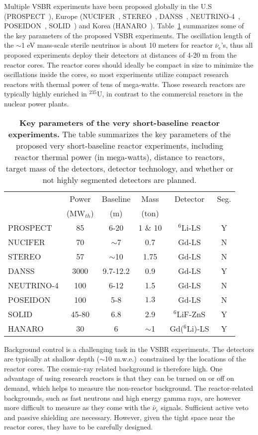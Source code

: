 \documentclass[aps,twocolumn,preprintnumbers,amsmath,superscriptaddress,amssymb,floats,nofootinbib]{revtex4-1}
\begin{document}
Multiple VSBR experiments have been proposed globally in the U.S (PROSPECT~\cite{PROSPECT}), Europe (NUCIFER~\cite{NUCIFER-2010, NUCIFER-2014}, STEREO~\cite{NUCIFER-2014}, DANSS~\cite{DANSS}, NEUTRINO-4~\cite{NEUTRINO4-2012,NEUTRINO4-2014}, POSEIDON~\cite{POSEIDON}, SOLID~\cite{SoLid}) and Korea (HANARO~\cite{HANARO}). 
Table~\ref{tab:sterile} summarizes some of the key parameters of the proposed VSBR experiments. 
The oscillation length of the $\sim$1 eV mass-scale sterile neutrinos is about 10 meters for reactor $\bar\nu_e$'s, thus all proposed experiments deploy their detectors at distances of 4-20 m from the reactor cores. 
The reactor cores should ideally be compact in size to minimize the oscillations inside the cores, so most experiments utilize compact research reactors with thermal power of tens of mega-watts. Those research reactors are typically highly enriched in $^{235}$U, in contrast to the commercial reactors in the nuclear power plants. 

\begin{table}[tb]
  \begin{tabular}{lccccc}
  \hline
  & Power & Baseline & Mass & Detector & Seg. \\
  & (MW$_{th}$) & (m) & (ton) &    & \\
  \hline
  PROSPECT  & 85  & 6-20 & 1 \& 10  & $^6$Li-LS & Y \\
  NUCIFER   & 70 & $\sim$7  & 0.7 & Gd-LS & N \\
  STEREO & 57  & $\sim$10 & 1.75  & Gd-LS & N \\
  DANSS & 3000  & 9.7-12.2  & 0.9  & Gd-LS & Y \\
  NEUTRINO-4 & 100  & 6-12  & 1.5  & Gd-LS & N \\
  POSEIDON & 100  & 5-8  & $1.3$ & Gd-LS & N \\
  SOLID & 45-80 & 6.8  & 2.9  & $^6$LiF-ZnS & Y \\
  HANARO & 30  & 6  & $\sim$1  & Gd($^6$Li)-LS & Y \\
  \hline
  \end{tabular}
  \caption{{\bf Key parameters of the very short-baseline reactor experiments.} The table summarizes the key parameters of the proposed very short-baseline reactor experiments, including reactor thermal power (in mega-watts), distance to reactors, target mass of the detectors, detector technology, and whether or not highly segmented detectors are planned.}
\label{tab:sterile}
\end{table}

Background control is a challenging task in the VSBR experiments. 
The detectors are typically at shallow depth ($\sim$10 m.w.e.)\ constrained by the locations of the reactor cores. 
The cosmic-ray related background is therefore high. 
One advantage of using research reactors is that they can be turned on or off on demand, which helps to measure the non-reactor background. 
The reactor-related backgrounds, such as fast neutrons and high energy gamma rays, are however more difficult to measure as they come with the $\bar\nu_e$ signals. Sufficient active veto and passive shielding are necessary. However, given the tight space near the reactor cores,  they have to be carefully designed.
\end{document}
